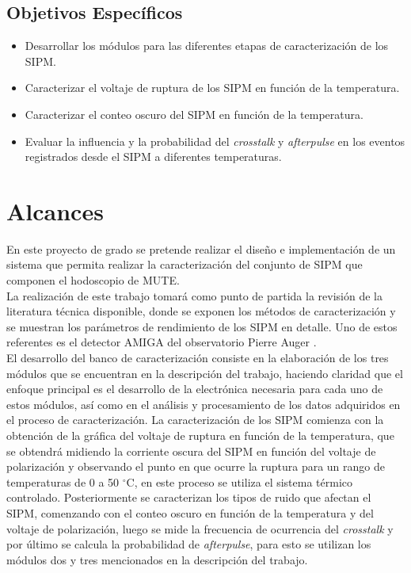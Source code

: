 \documentclass[11pt,letterpaper,oneside]{book}
\begin{document}
\section{\textbf{Objetivos Específicos}}

\begin{itemize}
    \item Desarrollar los módulos  para las diferentes etapas de caracterización de los SIPM.
    \item  Caracterizar el voltaje de ruptura de los SIPM en función de la temperatura.
	\item Caracterizar el conteo oscuro del SIPM en función de la temperatura.
    \item Evaluar la influencia y la probabilidad del \textit{crosstalk} y \textit{afterpulse} en los eventos registrados desde el SIPM a diferentes temperaturas. 
\end{itemize}


\newpage
\chapter{Alcances}
En este proyecto de grado se pretende realizar el diseño e implementación de un sistema que permita realizar la caracterización del conjunto de SIPM que componen el hodoscopio de MUTE. \\

La realización de este trabajo tomará como punto de partida la revisión de la literatura técnica disponible, donde se exponen los métodos de caracterización y se muestran los parámetros de rendimiento de los SIPM en detalle. Uno de estos referentes es el detector AMIGA del observatorio Pierre Auger \cite{Muon_detector_Amiga}. \\

El desarrollo del banco de caracterización consiste en la elaboración de los tres módulos que se encuentran en la descripción del trabajo, haciendo claridad que el enfoque principal es el desarrollo de la electrónica necesaria para cada uno de estos módulos, así como en el análisis y procesamiento de los datos adquiridos en el proceso de caracterización. La caracterización de los SIPM comienza con la obtención de la gráfica del voltaje de ruptura en función de la temperatura, que se obtendrá midiendo la corriente oscura del SIPM en función del voltaje de polarización y observando el punto en que ocurre la ruptura para un rango de temperaturas de 0 a 50 $^{\circ}$C, en este proceso se utiliza el sistema térmico controlado. Posteriormente se caracterizan los tipos de ruido que afectan el SIPM, comenzando con el conteo oscuro en función de la temperatura y del voltaje de polarización, luego se mide la frecuencia de ocurrencia del \textit{crosstalk} y por último se calcula la probabilidad de \textit{afterpulse}, para esto se utilizan los módulos dos y tres mencionados en la descripción del trabajo.\\
\end{document}
